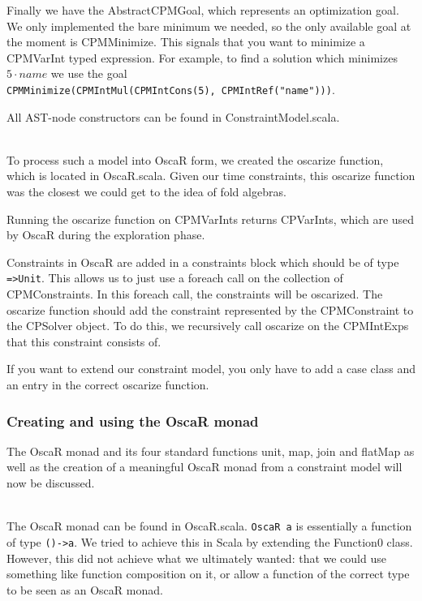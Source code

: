 \documentclass[a4paper]{article}
\begin{document}
Finally we have the AbstractCPMGoal, 
which represents an optimization goal.
We only implemented the bare minimum we needed,
so the only available goal at the moment is CPMMinimize.
This signals that you want to minimize a CPMVarInt typed
expression.
For example, to find a solution which minimizes $5\cdot name$ we use the goal
\\\verb|CPMMinimize(CPMIntMul(CPMIntCons(5), CPMIntRef("name")))|.

All AST-node constructors can be found in ConstraintModel.scala.

\hspace*{1em}\\
To process such a model into OscaR form, 
we created the oscarize function, which is located in OscaR.scala.
Given our time constraints, 
this oscarize function was the closest we could get to the idea of fold algebras.

Running the oscarize function on CPMVarInts returns CPVarInts,
which are used by OscaR during the exploration phase.

Constraints in OscaR are added in a constraints block which should be of type
\verb|=>Unit|.
This allows us to just use a foreach call on the collection of CPMConstraints.
In this foreach call, the constraints will be oscarized.
The oscarize function should add the constraint represented by the CPMConstraint
to the CPSolver object.
To do this, we recursively call oscarize on the CPMIntExps
that this constraint consists of.

If you want to extend our constraint model,
you only have to add a case class and an entry in the correct oscarize function.


\subsubsection{Creating and using the OscaR monad}
The OscaR monad and its four standard functions unit, map, join and flatMap as well as
the creation of a meaningful OscaR monad from a constraint model will now
be discussed.

\hspace*{1em}\\
The OscaR monad can be found in OscaR.scala.
\verb|OscaR a| is essentially a function of type \verb|()->a|.
We tried to achieve this in Scala by extending the Function0 class.
However, this did not achieve what we ultimately wanted: 
that we could use something like function composition on it,
or allow a function of the correct type to be seen as an OscaR monad.
\end{document}
